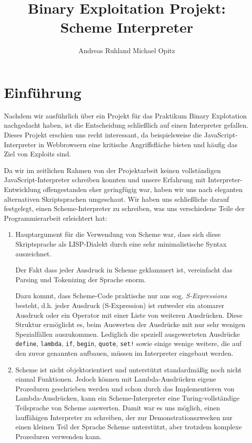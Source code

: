 \documentclass{sig-alternate}
\begin{document}
\title{Binary Exploitation Projekt: Scheme Interpreter}


\author{
\alignauthor
Andreas Ruhland
\alignauthor
Michael Opitz
}

\maketitle

\section[Einführung]{Einführung}
Nachdem wir ausführlich über ein Projekt für das Praktikum Binary Explotation
nachgedacht haben, ist die Entscheidung schließlich auf einen Interpreter
gefallen. Dieses Projekt erschien uns recht interessant, da beispielsweise
die JavaScript-Interpreter in Webbrowsern eine kritische Angriffsfläche bieten
und häufig das Ziel von Exploits sind.
\par
Da wir im zeitlichen Rahmen von der Projektarbeit keinen vollständigen
JavaScript-Interpreter schreiben konnten und unsere Erfahrung mit
Interpreter-Entwicklung offengestanden eher geringfügig war, haben wir uns
nach eleganten alternativen Skriptsprachen umgeschaut.
Wir haben uns schließliche darauf festgelegt, einen Scheme-Interpreter zu
schreiben, was uns verschiedene Teile der Programmierarbeit erleichtert hat:
\begin{enumerate}
  \item Hauptargument für die Verwendung von Scheme war, dass sich diese
    Skriptsprache als LISP-Dialekt durch eine sehr minimalistische Syntax
    auszeichnet.
    
    Der Fakt dass jeder Ausdruck in Scheme geklammert ist, vereinfacht das
    Parsing und Tokenizing der Sprache enorm.
    \par
    Dazu kommt, dass Scheme-Code praktische nur aus
    sog. \emph{S-Expressions} besteht, d.h.
    jeder Ausdruck (S-Expression) ist entweder ein atomarer Ausdruck oder
    ein Operator mit einer Liste von weiteren Ausdrücken. Diese Struktur
    ermöglicht es, beim Auswerten der Ausdrücke mit nur sehr wenigen Spezialfällen auszukommen.
    Lediglich die speziell ausgewerteten Ausdrücke \texttt{define},
    \texttt{lambda}, \texttt{if}, \texttt{begin}, \texttt{quote}, \texttt{set!}
    sowie einige wenige weitere, die auf den zuvor genannten aufbauen, müssen
    im Interpreter eingebaut werden.
  \item Scheme ist nicht objektorientiert und unterstützt standardmäßig noch
    nicht einmal Funktionen. Jedoch können mit Lambda-Ausdrücken eigene 
    Prozeduren geschrieben werden und schon durch das Implementieren
    von Lambda-Ausdrücken, kann ein Scheme-Interpreter eine Turing-vollständige
    Teilsprache von Scheme auswerten. Damit war es uns möglich, einen lauffähigen
    Interpreter zu schreiben, der zur Demonstrationszwecken nur einen kleinen
    Teil der Sprache Scheme unterstützt, aber trotzdem komplexe Prozeduren
    verwenden kann.
\end{enumerate}
\end{document}
